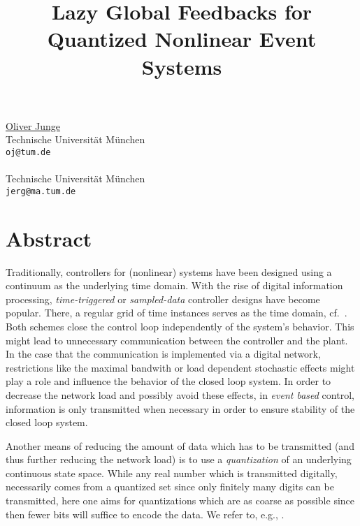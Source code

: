 \title{Lazy Global Feedbacks for Quantized Nonlinear Event Systems}
\author{}  \institute{}
\maketitle
\begin{center}
{\large \underline{Oliver Junge}}\\
Technische Universit\"at M\"unchen\\
{\tt oj@tum.de}
\\ \vspace{4mm}{\large Stefan Jerg}\\
Technische Universit\"at M\"unchen\\
{\tt jerg@ma.tum.de}

\end{center}

\section*{Abstract}

Traditionally, controllers for (nonlinear) systems have been designed using a continuum as the underlying time domain.  With the rise of digital information processing, \emph{time-triggered} or \emph{sampled-data} controller designs have become popular. There, a regular grid of time instances serves as the time domain, cf.\ \cite{AsWi97a}. Both schemes close the control loop independently of the system's behavior.  This might lead to unnecessary communication between the controller and the plant.  In the case that the communication is implemented via a digital network, restrictions like the maximal bandwith or load dependent stochastic effects might play a role and influence the behavior of the closed loop system.  In order to decrease the network load and possibly avoid these effects, in \emph{event based} control, information is only transmitted  when necessary in order to ensure stability of the closed loop system. 

Another means of reducing the amount of data which has to be transmitted (and thus further reducing the network load) is to use a \emph{quantization} of an underlying continuous state space.  While any real number which is transmitted digitally, necessarily comes from a quantized set since only finitely many digits can be transmitted, here one aims for quantizations which are as coarse as possible since then fewer bits will suffice to encode the data.  We refer to, e.g., \cite{Lu94a}.

